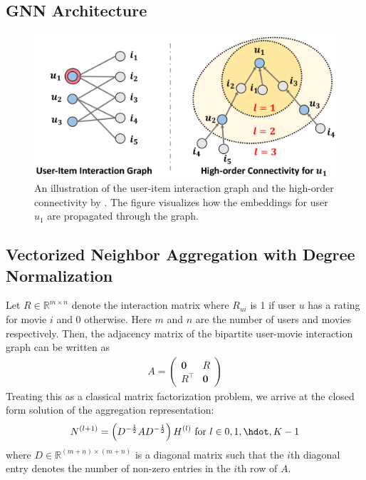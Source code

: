 \documentclass{article}
\begin{document}

\subsection{GNN Architecture}

\begin{figure}[H]
    \centering
    \includegraphics[width=.6\textwidth]{figs/ngcf-architecture.png}
    \caption{An illustration of the user-item interaction graph and the high-order connectivity by \cite{ngcf}. The figure visualizes how the embeddings for user $u_1$ are propagated through the graph.}
    \label{fig:user-item-interact-graph}
\end{figure}

\subsection{Vectorized Neighbor Aggregation with Degree Normalization} \label{vec-degree-norm}

Let $R \in \mathbb{R}^{m \times n}$ denote the interaction matrix where $R_{ui}$ is 1 if user $u$ has a rating for movie $i$ and 0 otherwise. Here $m$ and $n$ are the number of users and movies respectively. Then, the adjacency matrix of the bipartite user-movie interaction graph can be written as
    \begin{align*}
        A =
        \begin{pmatrix}
        \mathbf{0} & R \\
        R^\top & \mathbf{0}
        \end{pmatrix}
    \end{align*}
    Treating this as a classical matrix factorization problem, we arrive at the closed form solution of the aggregation representation:
    \begin{align*}
        N^{(l+1)} = \left( D^{-\frac{1}{2}} A D^{-\frac{1}{2}} \right) H^{(l)} \text{ for } l \in 0, 1, \hdot, K - 1
    \end{align*}
    where $D \in \mathbb{R}^{(m+n) \times (m+n)}$ is a diagonal matrix such that the $i$th diagonal entry denotes the number of non-zero entries in the $i$th row of $A$.
\end{document}

